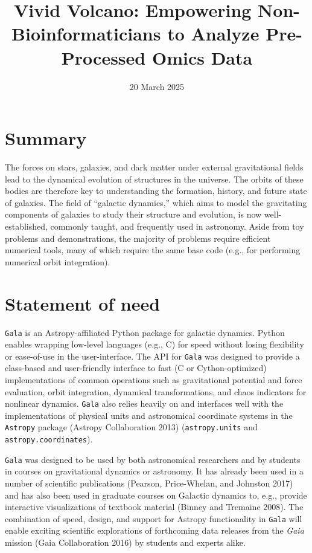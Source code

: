 \documentclass[
]{article}
\title{Vivid Volcano: Empowering Non-Bioinformaticians to Analyze
Pre-Processed Omics Data}
\author{}
\date{\vspace{-2.5em}20 March 2025}
\begin{document}
\maketitle

\section{Summary}\label{summary}

The forces on stars, galaxies, and dark matter under external
gravitational fields lead to the dynamical evolution of structures in
the universe. The orbits of these bodies are therefore key to
understanding the formation, history, and future state of galaxies. The
field of ``galactic dynamics,'' which aims to model the gravitating
components of galaxies to study their structure and evolution, is now
well-established, commonly taught, and frequently used in astronomy.
Aside from toy problems and demonstrations, the majority of problems
require efficient numerical tools, many of which require the same base
code (e.g., for performing numerical orbit integration).

\section{Statement of need}\label{statement-of-need}

\texttt{Gala} is an Astropy-affiliated Python package for galactic
dynamics. Python enables wrapping low-level languages (e.g., C) for
speed without losing flexibility or ease-of-use in the user-interface.
The API for \texttt{Gala} was designed to provide a class-based and
user-friendly interface to fast (C or Cython-optimized) implementations
of common operations such as gravitational potential and force
evaluation, orbit integration, dynamical transformations, and chaos
indicators for nonlinear dynamics. \texttt{Gala} also relies heavily on
and interfaces well with the implementations of physical units and
astronomical coordinate systems in the \texttt{Astropy} package (Astropy
Collaboration 2013) (\texttt{astropy.units} and
\texttt{astropy.coordinates}).

\texttt{Gala} was designed to be used by both astronomical researchers
and by students in courses on gravitational dynamics or astronomy. It
has already been used in a number of scientific publications (Pearson,
Price-Whelan, and Johnston 2017) and has also been used in graduate
courses on Galactic dynamics to, e.g., provide interactive
visualizations of textbook material (Binney and Tremaine 2008). The
combination of speed, design, and support for Astropy functionality in
\texttt{Gala} will enable exciting scientific explorations of
forthcoming data releases from the \emph{Gaia} mission (Gaia
Collaboration 2016) by students and experts alike.
\end{document}
